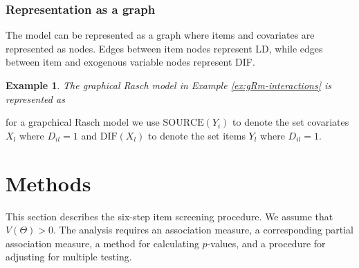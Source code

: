 \documentclass[12pt]{article}
\theoremstyle{examplestyle}
\newtheorem{example}{Example}[section]
\begin{document}
\subsubsection{Representation as a graph}

The model can be represented as a graph where items and covariates are represented as nodes. Edges between item nodes represent LD, while edges between item and exogenous variable nodes represent DIF. 

\begin{mybox3}
\begin{example}

The graphical Rasch model in Example \ref{ex:gRm-interactions} is represented as

\begin{center}
\end{center}
\end{example}
\end{mybox3}

for a grapchical Rasch model we use $\mathrm{SOURCE}(Y_i)$ to denote the set 
covariates $X_l$ where $D_{il}=1$ and $\mathrm{DIF}(X_l)$ to denote the set 
items $Y_l$ where $D_{il}=1$.

\section{Methods}\label{sec:it_sec}

This section describes the six-step item screening procedure. We assume that $V(\Theta)>0$. The analysis requires an association measure, a corresponding partial association measure, a method for calculating $p$-values, and a procedure for adjusting for multiple testing.
\end{document}
